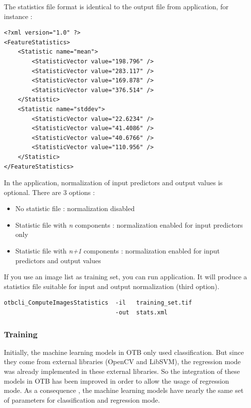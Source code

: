 The statistics file format is identical to the output file from 
application, for instance :
\begin{verbatim}
<?xml version="1.0" ?>
<FeatureStatistics>
    <Statistic name="mean">
        <StatisticVector value="198.796" />
        <StatisticVector value="283.117" />
        <StatisticVector value="169.878" />
        <StatisticVector value="376.514" />
    </Statistic>
    <Statistic name="stddev">
        <StatisticVector value="22.6234" />
        <StatisticVector value="41.4086" />
        <StatisticVector value="40.6766" />
        <StatisticVector value="110.956" />
    </Statistic>
</FeatureStatistics>
\end{verbatim}

In the  application, normalization of input predictors
and output values is optional. There are 3 options :
\begin{itemize}
\item No statistic file : normalization disabled
\item Statistic file with \textit{n} components : normalization enabled for input predictors only
\item Statistic file with \textit{n+1} components : normalization enabled for input predictors and output values
\end{itemize}

If you use an image list as training set, you can run 
application. It will produce a statistics file suitable for input and output normalization (third option).

\begin{verbatim}
otbcli_ComputeImagesStatistics  -il   training_set.tif
                                -out  stats.xml
\end{verbatim}

\subsubsection{Training}

Initially, the machine learning models in OTB only used classification. But since
they come from external libraries (OpenCV and LibSVM), the regression mode was
already implemented in these external libraries. So the integration of these models
in OTB has been improved in order to allow the usage of regression mode. As a consequence
, the machine learning models have nearly the same set of parameters for
classification and regression mode.

